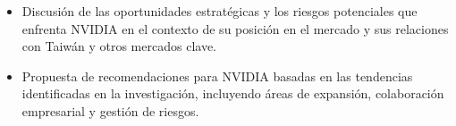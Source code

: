 \documentclass[conference]{IEEEtran}
\begin{document}
\begin{itemize}
	\item Discusión de las oportunidades estratégicas y los riesgos
	      potenciales que enfrenta NVIDIA en el contexto de su posición
	      en el mercado y sus relaciones con Taiwán y otros mercados clave.

	\item Propuesta de recomendaciones para NVIDIA basadas en
	      las tendencias identificadas en la investigación, incluyendo
	      áreas de expansión, colaboración empresarial y gestión de riesgos.
\end{itemize}


\end{document}
